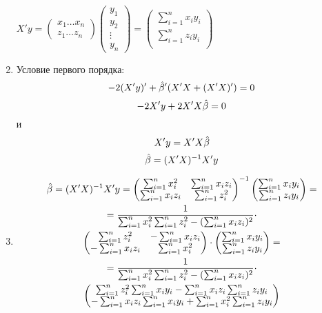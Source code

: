 \begin{problem}
\begin{sol}
\begin{enumerate}
$X'y=\begin{pmatrix}
x_{1}\ldots x_{n}\\
z_{1}\ldots z_{n}
\end{pmatrix}
\begin{pmatrix}
y_1\\
y_2\\
\vdots\\
y_n
\end{pmatrix}=
\begin{pmatrix}
\sum_{i=1}^n x_i y_i \\
\sum_{i=1}^n z_i y_i \\
\end{pmatrix}$

\item
Условие первого порядка:
\[-2(X'y)'+\hat{\beta}'(X'X+(X'X)')=0\]
\[-2X'y+2X'X \hat{\beta} =0\]
и
\[X'y=X'X\hat{\beta}\]
\[\hat{\beta}=(X'X)^{-1}X'y\]

\item
\begin{multline*}
\hat{\beta}=(X'X)^{-1}X'y=
\begin{pmatrix}
\sum_{i=1}^n x^2_i   & \sum_{i=1}^n x_i z_i \\
\sum_{i=1}^n x_i z_i & \sum_{i=1}^n z^2_i
\end{pmatrix}^{-1}
\begin{pmatrix}
\sum_{i=1}^n x_i y_i \\
\sum_{i=1}^n z_i y_i \\
\end{pmatrix}=\\
=\frac{1}{\sum_{i=1}^n x^2_{i}\sum_{i=1}^n z^2_{i}-(\sum_{i=1}^n x_i z_i)^2}\cdot\\
\begin{pmatrix}
\sum_{i=1}^n z^2_i   & -\sum_{i=1}^n x_i z_i \\
-\sum_{i=1}^n x_i z_i & \sum_{i=1}^n x^2_i
\end{pmatrix}\cdot
\begin{pmatrix}
\sum_{i=1}^n x_i y_i \\
\sum_{i=1}^n z_i y_i \\
\end{pmatrix}=\\
=\frac{1}{\sum_{i=1}^n x^2_{i}\sum_{i=1}^n z^2_{i}-(\sum_{i=1}^n x_i z_i)^2}\cdot\\
\begin{pmatrix}
  \sum_{i=1}^n z^2_i  \sum_{i=1}^n x_i y_i  -\sum_{i=1}^n x_i z_i  \sum_{i=1}^n z_i y_i \\
-\sum_{i=1}^n x_i z_i \sum_{i=1}^n x_i y_i + \sum_{i=1}^n x^2_i  \sum_{i=1}^n z_i y_i \\
\end{pmatrix}
\end{multline*}
\end{enumerate}
\end{sol}
\end{problem}




